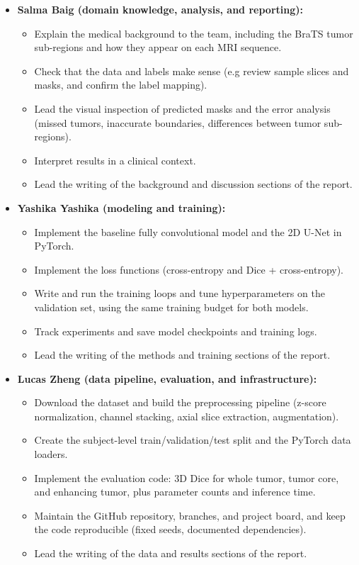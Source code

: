 \documentclass[12pt]{article}
\begin{document}
\begin{itemize}
  \item \textbf{Salma Baig (domain knowledge, analysis, and reporting):}
  \begin{itemize}
    \item Explain the medical background to the team, including the BraTS tumor sub-regions and how they appear on each MRI sequence.
    \item Check that the data and labels make sense (e.g review sample slices and masks, and confirm the label mapping).
    \item Lead the visual inspection of predicted masks and the error analysis (missed tumors, inaccurate boundaries, differences between tumor sub-regions).
    \item Interpret results in a clinical context.
    \item Lead the writing of the background and discussion sections of the report.
  \end{itemize}
 
  \item \textbf{Yashika Yashika (modeling and training):}
  \begin{itemize}
    \item Implement the baseline fully convolutional model and the 2D U-Net in PyTorch.
    \item Implement the loss functions (cross-entropy and Dice + cross-entropy).
    \item Write and run the training loops and tune hyperparameters on the validation set, using the same training budget for both models.
    \item Track experiments and save model checkpoints and training logs.
    \item Lead the writing of the methods and training sections of the report.
  \end{itemize}
 
  \item \textbf{Lucas Zheng (data pipeline, evaluation, and infrastructure):}
  \begin{itemize}
    \item Download the dataset and build the preprocessing pipeline (z-score normalization, channel stacking, axial slice extraction, augmentation).
    \item Create the subject-level train/validation/test split and the PyTorch data loaders.
    \item Implement the evaluation code: 3D Dice for whole tumor, tumor core, and enhancing tumor, plus parameter counts and inference time.
    \item Maintain the GitHub repository, branches, and project board, and keep the code reproducible (fixed seeds, documented dependencies).
    \item Lead the writing of the data and results sections of the report.
  \end{itemize}
\end{itemize}
 
\end{document}
